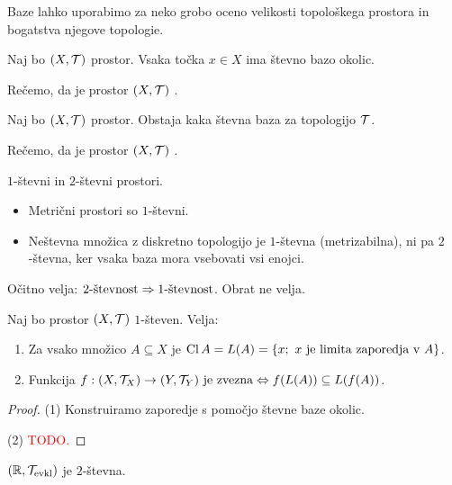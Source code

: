 Baze lahko uporabimo za neko grobo oceno velikosti topološkega prostora in bogatstva njegove topologie.

\begin{aksiom}
    Naj bo $(X, \mathcal{T})$ prostor. Vsaka točka $x \in X$ ima števno bazo okolic.

    Rečemo, da je prostor $(X, \mathcal{T})$ . 
\end{aksiom}

\begin{aksiom}
    Naj bo $(X, \mathcal{T})$ prostor. Obstaja kaka števna baza za topologijo $\mathcal{T}$.

    Rečemo, da je prostor $(X, \mathcal{T})$ . 
\end{aksiom}

\begin{primer}
    $1$-števni in $2$-števni prostori. 
    \begin{itemize}
        \item Metrični prostori so $1$-števni. 
        \item Neštevna množica z diskretno topologijo je $1$-števna (metrizabilna), ni pa $2$-števna, ker vsaka baza mora vsebovati vsi enojci.
    \end{itemize}
\end{primer}

\begin{trditev}
    Očitno velja: $2\text{-števnost} \Rightarrow 1\text{-števnost}$. Obrat ne velja. 
\end{trditev}

\begin{trditev}
    Naj bo prostor $(X, \mathcal{T})$ $1$-števen. Velja:
    \begin{enumerate}
        \item Za vsako množico $A \subseteq X$ je $\operatorname{Cl} A = L(A) = \left\{x; \ x \text{ je limita zaporedja v } A\right\}$.
        \item Funkcija $f: (X, \mathcal{T}_X) \to (Y, \mathcal{T}_Y) \text{ je zvezna} \Leftrightarrow f(L(A)) \subseteq L(f(A))$.
    \end{enumerate}
\end{trditev}

\begin{proof}
    (1) Konstruiramo zaporedje s pomočjo števne baze okolic.

    (2) \textcolor{red}{TODO.}
\end{proof}

\begin{primer}
    $(\mathbb{R}, \mathcal{T}_{\text{evkl}})$ je $2$-števna.
\end{primer}

